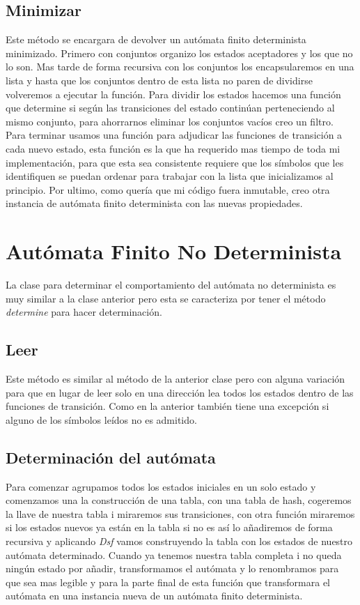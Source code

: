 \documentclass{article}
\begin{document}
    \subsection{Minimizar}\label{subsec:minimizar}
    Este método se encargara de devolver un autómata finito determinista minimizado.
    Primero con conjuntos organizo los estados aceptadores y los que no lo son.
    Mas tarde de forma recursiva con los conjuntos los encapsularemos en una lista y hasta que los conjuntos dentro de esta lista no paren de dividirse volveremos a ejecutar la función.
    Para dividir los estados hacemos una función que determine si según las transiciones del estado continúan perteneciendo al mismo conjunto, para ahorrarnos eliminar los conjuntos vacíos creo un filtro. Para terminar usamos una función para adjudicar las funciones de transición a cada nuevo estado, esta función es la que ha requerido mas tiempo de toda mi implementación, para que esta sea consistente requiere que los símbolos que les identifiquen se puedan ordenar para trabajar con la lista que inicializamos al principio.
    Por ultimo, como quería que mi código fuera inmutable, creo otra instancia de autómata  finito determinista con las nuevas propiedades.

    \section{Autómata Finito No Determinista}\label{sec:autómata-finito-no-determinista}
    La clase para determinar el comportamiento del autómata no determinista es muy similar a la clase anterior pero esta se caracteriza por tener el método  \textit{determine} para hacer determinación.

    \subsection{Leer}\label{subsec:leer}
    Este método es similar al método de la anterior clase pero con alguna variación para que en lugar de leer solo en una dirección lea todos los estados dentro de las funciones de transición. Como en la anterior también tiene una excepción si alguno de los símbolos leídos no es admitido.

    \subsection{Determinación del autómata}
    Para comenzar agrupamos todos los estados iniciales en un solo estado y comenzamos una la construcción de una tabla, con una tabla de hash, cogeremos la llave de nuestra tabla i miraremos sus transiciones, con otra función miraremos si los estados nuevos ya están en la tabla si no es así lo añadiremos de forma recursiva y aplicando \textit{Dsf} vamos construyendo la tabla con los estados de nuestro autómata determinado. Cuando ya tenemos nuestra tabla completa i no queda ningún estado por añadir, transformamos el autómata y lo renombramos para que sea mas legible y para la parte final de esta función que transformara el autómata en una instancia nueva de un autómata finito determinista.
\end{document}
